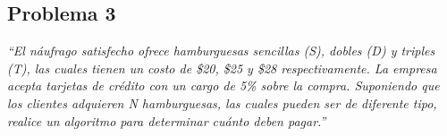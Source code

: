 \subsection{Problema 3}

\textit {“El náufrago satisfecho ofrece hamburguesas sencillas (S), dobles (D) y triples (T), las cuales tienen un costo de \$20, \$25 y \$28 respectivamente. La empresa acepta tarjetas de crédito con un cargo de 5\% sobre la compra. Suponiendo que los clientes adquieren N hamburguesas, las cuales pueden ser de diferente tipo, realice un algoritmo para determinar cuánto deben pagar.”}

